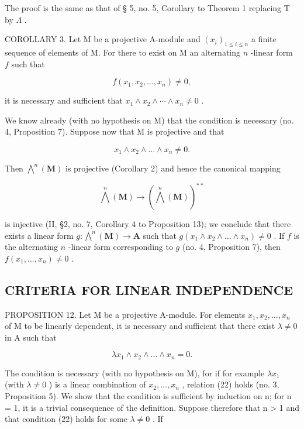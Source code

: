 The proof is the same as that of § 5, no. 5, Corollary to Theorem 1 replacing T by \(\Lambda\) .

COROLLARY 3. Let M be a projective A-module and \((x_{i})_{1\leqslant i\leqslant n}\) a finite sequence of elements of M. For there to exist on M an alternating \(n\) -linear form \(f\) such that

\[
f (x _ {1}, x _ {2}, \dots , x _ {n}) \neq 0,
\]

it is necessary and sufficient that \(x_{1} \wedge x_{2} \wedge \cdots \wedge x_{n} \neq 0\) .

We know already (with no hypothesis on M) that the condition is necessary (no. 4, Proposition 7). Suppose now that M is projective and that

\[
x _ {1} \wedge x _ {2} \wedge \dots \wedge x _ {n} \neq 0.
\]

Then \(\bigwedge^n (\mathbf{M})\) is projective (Corollary 2) and hence the canonical mapping

\[
\bigwedge^ {n} (\mathbf {M}) \rightarrow (\bigwedge^ {n} (\mathbf {M})) ^ {* *}
\]

is injective (II, §2, no. 7, Corollary 4 to Proposition 13); we conclude that there exists a linear form \(g: \bigwedge^{n}(\mathbf{M}) \to \mathbf{A}\) such that \(g(x_{1} \wedge x_{2} \wedge \dots \wedge x_{n}) \neq 0\) . If \(f\) is the alternating \(n\) -linear form corresponding to \(g\) (no. 4, Proposition 7), then \(f(x_{1}, \ldots, x_{n}) \neq 0\) .

\subsection{CRITERIA FOR LINEAR INDEPENDENCE}

PROPOSITION 12. Let M be a projective A-module. For elements \(x_1, x_2, \ldots, x_n\) of M to be linearly dependent, it is necessary and sufficient that there exist \(\lambda \neq 0\) in A such that

\[
\lambda x _ {1} \wedge x _ {2} \wedge \dots \wedge x _ {n} = 0.\tag{22}
\]

The condition is necessary (with no hypothesis on M), for if for example \(\lambda x_{1}\) (with \(\lambda \neq 0\) ) is a linear combination of \(x_{2}, \ldots, x_{n}\) , relation (22) holds (no. 3, Proposition 5). We show that the condition is sufficient by induction on n; for n = 1, it is a trivial consequence of the definition. Suppose therefore that n \textgreater{} 1 and that condition (22) holds for some \(\lambda \neq 0\) . If


